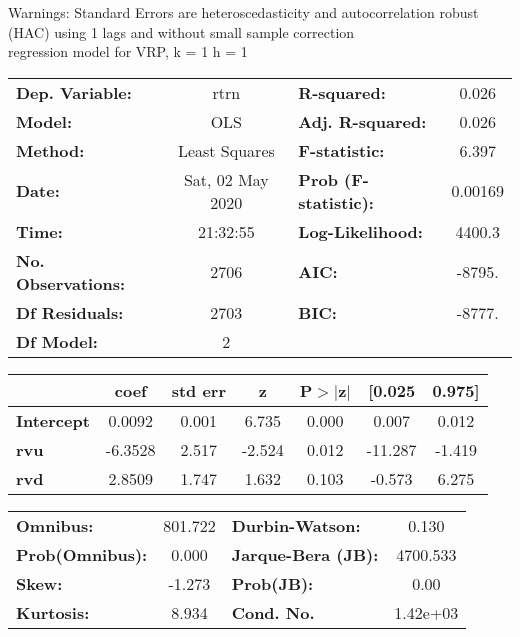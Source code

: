 Warnings: \newline
 [1] Standard Errors are heteroscedasticity and autocorrelation robust (HAC) using 1 lags and without small sample correction\\ 

regression model for VRP, k = 1 h = 1\begin{center}
\begin{tabular}{lclc}
\toprule
\textbf{Dep. Variable:}    &       rtrn       & \textbf{  R-squared:         } &     0.026   \\
\textbf{Model:}            &       OLS        & \textbf{  Adj. R-squared:    } &     0.026   \\
\textbf{Method:}           &  Least Squares   & \textbf{  F-statistic:       } &     6.397   \\
\textbf{Date:}             & Sat, 02 May 2020 & \textbf{  Prob (F-statistic):} &  0.00169    \\
\textbf{Time:}             &     21:32:55     & \textbf{  Log-Likelihood:    } &    4400.3   \\
\textbf{No. Observations:} &        2706      & \textbf{  AIC:               } &    -8795.   \\
\textbf{Df Residuals:}     &        2703      & \textbf{  BIC:               } &    -8777.   \\
\textbf{Df Model:}         &           2      & \textbf{                     } &             \\
\bottomrule
\end{tabular}
\begin{tabular}{lcccccc}
                   & \textbf{coef} & \textbf{std err} & \textbf{z} & \textbf{P$> |$z$|$} & \textbf{[0.025} & \textbf{0.975]}  \\
\midrule
\textbf{Intercept} &       0.0092  &        0.001     &     6.735  &         0.000        &        0.007    &        0.012     \\
\textbf{rvu}       &      -6.3528  &        2.517     &    -2.524  &         0.012        &      -11.287    &       -1.419     \\
\textbf{rvd}       &       2.8509  &        1.747     &     1.632  &         0.103        &       -0.573    &        6.275     \\
\bottomrule
\end{tabular}
\begin{tabular}{lclc}
\textbf{Omnibus:}       & 801.722 & \textbf{  Durbin-Watson:     } &    0.130  \\
\textbf{Prob(Omnibus):} &   0.000 & \textbf{  Jarque-Bera (JB):  } & 4700.533  \\
\textbf{Skew:}          &  -1.273 & \textbf{  Prob(JB):          } &     0.00  \\
\textbf{Kurtosis:}      &   8.934 & \textbf{  Cond. No.          } & 1.42e+03  \\
\bottomrule
\end{tabular}
\end{center}

